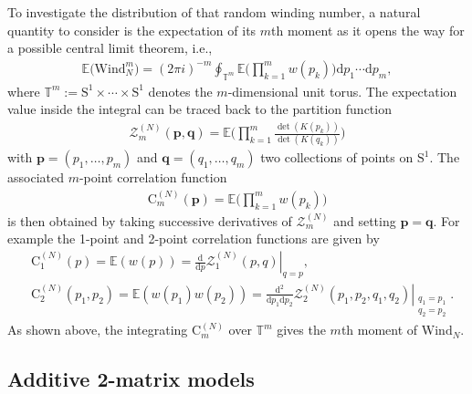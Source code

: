 \documentclass[pdflatex,sn-mathphys-num]{sn-jnl}
\theoremstyle{thmstyleone}
\numberwithin{equation}{section}
\newcommand{\Sp}{\mathrm{S}^{1}}
\newcommand{\Cc}{\mathrm{C}}
\begin{document}
To investigate the distribution of that random winding number, a natural quantity to consider is the expectation of its $m$th moment as it opens the way for a possible central limit theorem, i.e.,
\begin{align}
    \mathbb{E}\Big(\mathrm{Wind}_{N}^{m}\Big)=(2\pi i)^{-m}\oint_{\mathbb{T}^{m}}\mathbb{E}\Bigg(\prod_{k=1}^{m} w\left( p_{k} \right)\Bigg)\mathrm{d}p_{1}\cdots \mathrm{d}p_{m},\label{moment.def}
\end{align}
where $\mathbb{T}^{m}:=\Sp\times\cdots\times\mathrm{S^{1}}$ denotes the $m$-dimensional unit torus.
The expectation value inside the integral can be traced back to the partition function
\begin{align}\label{partitionfunction1}
    \mathscr{Z}^{\left(N\right)}_{m}\left ( \mathbf{p},\mathbf{q} \right )=\mathbb{E}\Bigg(\prod\limits_{k=1}^{m}\frac{\det\left ( K\left ( p_{k} \right ) \right )}{\det\left ( K\left ( q_{k} \right ) \right )}\Bigg)
\end{align}
with $\mathbf{p}=\left(p_{1},\ldots,p_{m}\right)$ and $\mathbf{q}=\left(q_{1},\ldots,q_{m}\right)$ two collections of points on $\Sp$.
The associated $m$-point correlation function 
\begin{align}
    \Cc_{m}^{(N)}(\mathbf{p})=\mathbb{E}\Bigg(\prod_{k=1}^{m} w\left( p_{k} \right)\Bigg)
\end{align}
is then obtained by taking successive derivatives of $\mathscr{Z}^{\left(N\right)}_{m}$ and setting $\mathbf{p}=\mathbf{q}$. For example the 1-point and 2-point correlation functions are given by
\begin{align}
        &\Cc^{\left ( N \right )}_{1}\left ( p \right )=\mathbb{E}\left ( w\left ( p \right ) \right )=\left.\frac{\mathrm{d}}{\mathrm{d}p} \mathscr{Z}^{\left(N\right)}_{\mathrm{1}}\left(p,q\right) \right|_{q=p},
        \label{C1.def}\\
        &\Cc^{\left ( N \right )}_{2}\left ( p_{1},p_{2} \right )=\mathbb{E}\left ( w\left ( p_{1} \right )w\left ( p_{2} \right ) \right )=\left.\frac{\mathrm{d}^{2}}{\mathrm{d}p_{1}\mathrm{d}p_{2}} \mathscr{Z}^{\left(N\right)}_{\mathrm{2}}\left(p_{1},p_{2},q_{1},q_{2}\right) \right|_{\substack{q_{1}=p_{1}\\q_{2}=p_{2}}}.
\end{align}
As shown above, the integrating $\Cc^{\left ( N \right )}_{m}$ over $\mathbb{T}^{m}$ gives the $m$th moment of $\mathrm{Wind}_{N}$. 



\subsection{Additive 2-matrix models}\label{sec:random-matrix}
\end{document}

